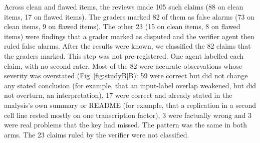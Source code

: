 Across clean and flawed items, the reviews made 105 such claims (88 on
clean items, 17 on flawed items). The graders marked 82 of them as false
alarms (73 on clean items, 9 on flawed items). The other 23 (15 on clean
items, 8 on flawed items) were findings that a grader marked as disputed
and the verifier agent then ruled false alarms. After the results were
known, we classified the 82 claims that the graders marked. This step was
not pre-registered. One agent labelled each claim, with no second rater.
Most of the 82 were accurate observations whose severity was overstated
(Fig~\ref{fig:studyB}B): 59 were correct but did not change any stated
conclusion (for example, that an input-label overlap weakened, but did
not overturn, an interpretation), 17 were correct and already stated in
the analysis's own summary or README (for example, that a replication in
a second cell line rested mostly on one transcription factor), 3 were
factually wrong and 3 were real problems that the key had missed. The
pattern was the same in both arms. The 23 claims ruled by the verifier
were not classified.

